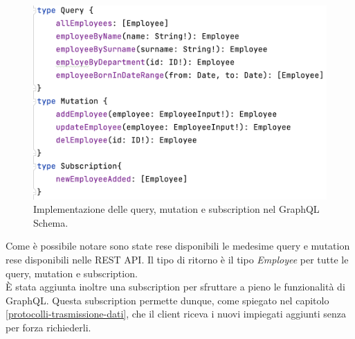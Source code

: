 \FloatBarrier
\begin{figure}[!ht]
\centering
\includegraphics[width=0.6\linewidth]{immagini/queryEmployee.png}
\caption{Implementazione delle query, mutation e subscription nel GraphQL Schema.}
\label{query-employee}
\end{figure}
\FloatBarrier
Come è possibile notare sono state rese disponibili le medesime query e mutation rese disponibili nelle REST API. Il tipo di ritorno è il tipo \textit{Employee} per tutte le query, mutation e subscription.\\
È stata aggiunta inoltre una subscription per sfruttare a pieno le funzionalità di GraphQL. Questa subscription permette dunque, come spiegato nel capitolo \ref{protocolli-trasmissione-dati}, che il client riceva i nuovi impiegati aggiunti senza per forza richiederli.\\

